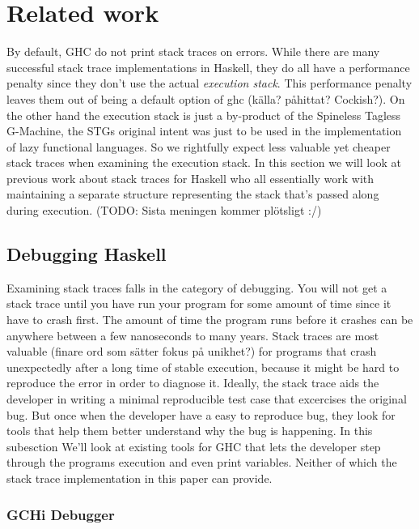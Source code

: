 \section{Related work}

By default, GHC do not print stack traces on errors. While there are many
successful stack trace implementations in Haskell, they do all have a
performance penalty since they don't use the actual \emph{execution stack}.
This performance penalty leaves them out of being a default option of ghc
(källa?  påhittat? Cockish?).  On the other hand the execution stack is just a
by-product of the Spineless Tagless G-Machine, the STGs original intent was
just to be used in the implementation of lazy functional languages.  So we
rightfully expect less valuable yet cheaper stack traces when examining the
execution stack.  In this section we will look at previous work about stack
traces for Haskell who all essentially work with maintaining a separate
structure representing the stack that's passed along during execution.
(TODO: Sista meningen kommer plötsligt :/)

\subsection{Debugging Haskell}

Examining stack traces falls in the category of debugging. You will not
get a stack trace until you have run your program for some amount of
time since it have to crash first. The amount of time the program runs
before it crashes can be anywhere between a few nanoseconds to many
years. Stack traces are most valuable (finare ord som sätter fokus på
unikhet?) for programs that crash unexpectedly after a long time of
stable execution, because it might be hard to reproduce the error in
order to diagnose it. Ideally, the stack trace aids the developer in
writing a minimal reproducible test case that excercises the original
bug.  But once when the developer have a easy to reproduce bug, they
look for tools that help them better understand why the bug is happening.
In this subesction We'll look at existing tools for GHC that lets
the developer step through the programs execution and even print
variables. Neither of which the stack trace implementation in this paper
can provide.

\subsubsection{GCHi Debugger}

